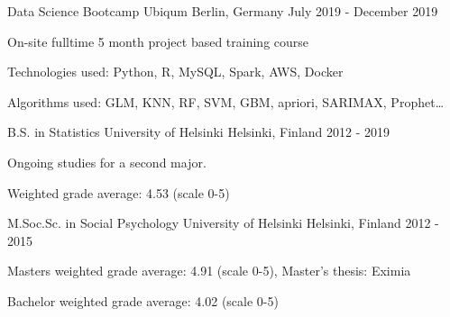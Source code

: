 

\begin{cventries}


  \cventry
    {Data Science Bootcamp} %
    {Ubiqum} %
    {Berlin, Germany} %
    {July 2019 - December 2019} %
    {
      \begin{cvitems} %
        \item {On-site fulltime 5 month project based training course}
        \item {Technologies used: Python, R, MySQL, Spark, AWS, Docker}
        \item {Algorithms used: GLM, KNN, RF, SVM, GBM, apriori, SARIMAX, Prophet\ldots}
      \end{cvitems}
    }

  \cventry
    {B.S. in Statistics} %
    {University of Helsinki} %
    {Helsinki, Finland} %
    {2012 - 2019} %
    {
      \begin{cvitems} %
        \item {Ongoing studies for a second major.}
        \item {Weighted grade average: 4.53 (scale 0-5)}
      \end{cvitems}
    }

  \cventry
    {M.Soc.Sc. in Social Psychology} %
    {University of Helsinki} %
    {Helsinki, Finland} %
    {2012 - 2015} %
    {
      \begin{cvitems} %
        \item {Masters weighted grade average: 4.91 (scale 0-5), Master's thesis: Eximia}
        \item {Bachelor weighted grade average: 4.02 (scale 0-5)}
      \end{cvitems}
    }

\end{cventries}
